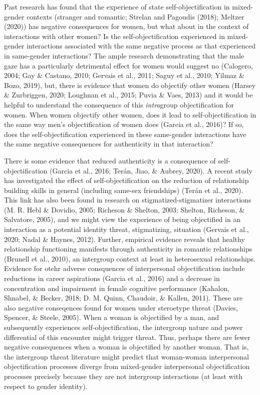 \documentclass[man]{apa6}
\begin{document}
Past research has found that the experience of state
self-objectification in mixed-gender contexts (stranger and romantic;
Strelan and Pagoudis (2018); Meltzer (2020)) has negative consequences
for women, but what about in the context of interactions with other
women? Is the self-objectification experienced in mixed-gender
interactions associated with the same negative process as that
experienced in same-gender interactions? The ample research
demonstrating that the male gaze has a particularly detrimental effect
for women would suggest no (Calogero, 2004; Gay \& Castano, 2010;
Gervais et al., 2011; Saguy et al., 2010; Yilmaz \& Bozo, 2019), but,
there is evidence that women do objectify other women (Harsey \&
Zurbriggen, 2020; Loughnan et al., 2015; Puvia \& Vaes, 2013) and it
would be helpful to understand the consequencs of this \emph{intra}group
objectification for women. When women objectify other women, does it
lead to self-objectification in the same way men's objectification of
women does (Garcia et al., 2016)? If so, does the self-objectification
experienced in these same-gender interactions have the same negative
consequences for authenticity in that interaction?

There is some evidence that reduced authenticity is a consequence of
self-objectification (Garcia et al., 2016; Terán, Jiao, \& Aubrey,
2020). A recent study has investigated the effect of
self-objectification on the reduction of relationship building skills in
general (including same-sex friendships) (Terán et al., 2020). This link
has also been found in research on stigmatized-stigmatizer interactions
(M. R. Hebl \& Dovidio, 2005; Richeson \& Shelton, 2003; Shelton,
Richeson, \& Salvatore, 2005), and we might view the experience of being
objectified in an interaction as a potential identity threat,
stigmatizing, situation (Gervais et al., 2020; Nadal \& Haynes, 2012).
Further, empirical evidence reveals that healthy relationship
functioning manifests through authenticity in romantic relationships
(Brunell et al., 2010), an intergroup context at least in heterosexual
relationships. Evidence for otehr adverse consquences of interpersonal
objectification include reductions in career aspirations (Garcia et al.,
2016) and a decrease in concentration and impairment in female cognitive
performance (Kahalon, Shnabel, \& Becker, 2018; D. M. Quinn, Chaudoir,
\& Kallen, 2011). These are also negative conseqences found for women
under steroetype threat (Davies, Spencer, \& Steele, 2005). When a woman
is objectified by a man, and subsequently experiences
self-objectification, the intergroup nature and power differential of
this encounter might trigger threat. Thus, perhaps there are fewer
negative consequences when a woman is objectified by another woman. That
is, the intergroup threat literature might predict that woman-woman
interpersonal objectification processes diverge from mixed-gender
interpersonal objectification processes precisely because they are not
intergroup interactions (at least with respect to gender identity).
\end{document}
